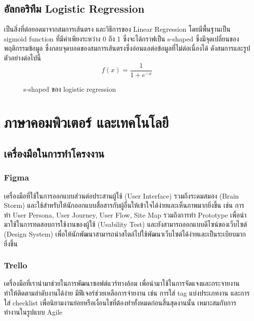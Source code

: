 \subsection{อัลกอริทึม Logistic Regression}
เป็นสิ่งที่ต่อยอดมาจากสมการเส้นตรง และวิธีการของ Linear Regression โดยมีพื้นฐานเป็น sigmoid function ที่มีค่าเพียงระหว่าง 0 ถึง 1 ซึ่งจะได้กราฟเป็น s-shaped ซึ่งมีจุดเปลี่ยนของพฤติกรรมข้อมูล ซึ่งกลบจุดบอดของสมการเส้นตรงซึ่งอ่อนแอต่อข้อมูลที่ไม่ต่อเนื่องได้ ดังสมการและรูปตัวอย่างต่อไปนี้
\[f(x) = \frac{1}{1+e^{-x}}\]
\begin{figure}[H]\centering
      \setlength{\fboxrule}{0.2mm}
      \setlength{\fboxsep}{0.5cm}
      \caption{s-shaped ของ logistic regression}\label{fig:s-shaped}
\end{figure}

\section{ภาษาคอมพิวเตอร์ และเทคโนโลยี}
\subsection{เครื่องมือในการทำโครงงาน}
\subsubsection{Figma}
\label{subsec:Figma}
เครื่องมือที่ใช้ในการออกแบบส่วนต่อประสานผู้ใช้ (User Interface) รวมถึงระดมสมอง (Brain Storm)
และใช้สำหรับให้นักออกแบบสื่อสารกับผู้อื่นให้เข้าใจได้ง่ายและเห็นภาพมากยิ่งขึ้น
เช่น การทำ User Persona, User Journey, User Flow, Site Map รวมถึงการทำ
Prototype เพื่อนำมาใช้ในการทดสอบการใช้งานของผู้ใช้ (Usability Test)
และยังสามารถออกแบบดีไซน์ของเว็บไซต์ (Design System)
เพื่อให้นักพัฒนาสามารถนำสไตล์ไปใช้พัฒนาเว็บไซต์ได้ง่ายและเป็นระเบียบมากยิ่งขึ้น
\subsubsection{Trello}
เครื่องมือที่เรานำมาช่วยในการพัฒนาซอฟต์แวร์ทางอ้อม เพื่อนำมาใช้ในการจัดแจงและกระจายงาน ทำให้ติดตามลำดับงานได้ง่าย
มีฟีเจอร์ช่วยเหลือการจ่ายงาน เช่น การใส่ tag แบ่งประเภทงาน และการใส่ checklist เพื่อนิยามงานย่อยหรือเงื่อนไขที่ต้องทำทั้งหมดก่อนสิ้นสุดงานนั้น
เหมาะสมกับการทำงานในรูปแบบ Agile
